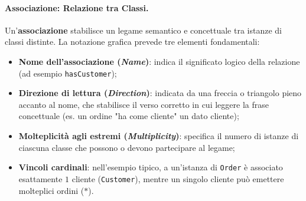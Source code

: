 \documentclass[12pt]{extarticle}
\newcommand{\cn}[1]{\makebox[\linewidth][c]{\textbf{#1}}}
\begin{document}
\paragraph{Associazione: Relazione tra Classi.}
Un'\textbf{associazione} stabilisce un legame semantico e concettuale tra istanze di classi distinte.
La notazione grafica prevede tre elementi fondamentali:
\begin{itemize}
    \item \textbf{Nome dell'associazione (\textit{Name})}: indica il significato logico della relazione (ad esempio \texttt{hasCustomer});
    \item \textbf{Direzione di lettura (\textit{Direction})}: indicata da una freccia o triangolo pieno accanto al nome, che stabilisce il verso corretto in cui leggere la frase concettuale (es. un ordine "ha come cliente" un dato cliente);
    \item \textbf{Molteplicità agli estremi (\textit{Multiplicity})}: specifica il numero di istanze di ciascuna classe che possono o devono partecipare al legame;
    \item \textbf{Vincoli cardinali}: nell'esempio tipico, a un'istanza di \texttt{Order} è associato esattamente $1$ cliente (\texttt{Customer}), mentre un singolo cliente può emettere molteplici ordini ($*$).
\end{itemize}

\begin{figure}[htbp]
    \centering
{}
    \label{fig:association_order_customer}
\end{figure}
\end{document}
